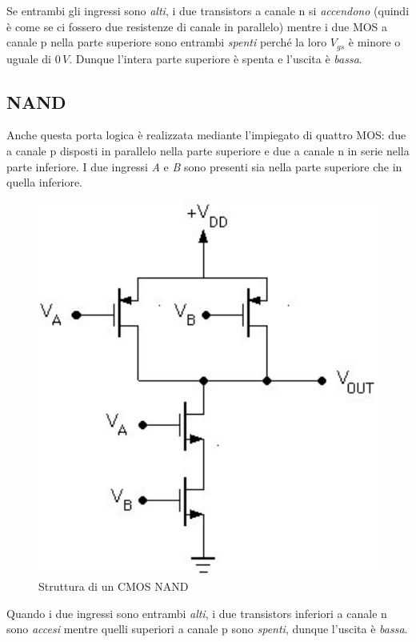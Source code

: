 \documentclass[12pt, a4paper]{report}
\begin{document}
Se entrambi gli ingressi sono \textit{alti}, i due transistors a canale n si \textit{accendono} (quindi è come se ci fossero due resistenze di canale in parallelo) mentre i due MOS a canale p nella parte superiore sono entrambi \textit{spenti} perché la loro $V_{gs}$ è minore o uguale di $0\,V$. Dunque l'intera parte superiore è spenta e l'uscita è \textit{bassa}. 

\subsection{NAND}
Anche questa porta logica è realizzata mediante l'impiegato di quattro MOS: due a canale p disposti in parallelo nella parte superiore e due a canale n in serie nella parte inferiore. I due ingressi \textit{A} e \textit{B} sono presenti sia nella parte superiore che in quella inferiore.
\begin{figure}[h]
    \centering
    \includegraphics[scale=0.4,angle=0]{cmos_nand.png}
    \caption{Struttura di un CMOS NAND}
\end{figure}

Quando i due ingressi sono entrambi \textit{alti}, i due transistors inferiori a canale n sono \textit{accesi} mentre quelli superiori a canale p sono \textit{spenti}, dunque l'uscita è \textit{bassa}.
\end{document}
